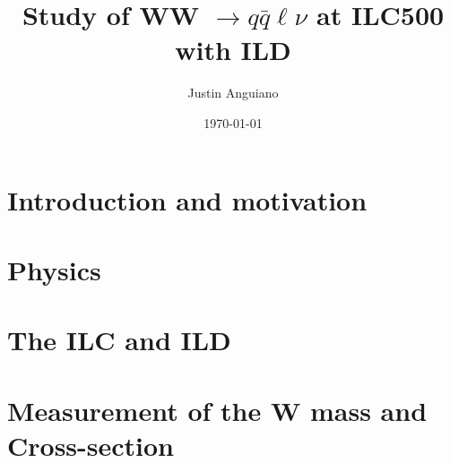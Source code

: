 \documentclass[%
 amsmath,amssymb,
 aps,
 prc
]{revtex4-1}
\begin{document}
\title{Study of WW $\rightarrow q\bar{q}\ell\nu$ at ILC500 with ILD }
\author{Justin Anguiano}
\date{\today}



\begin{abstract}

\end{abstract}


\maketitle
\clearpage\mbox{}\clearpage

\section{Introduction and motivation}
\label{sec:Introduction}


\section{Physics}
\label{sec:physics}





\section{The ILC and ILD}
\label{sec:ILC_detector}



\section{Measurement of the W mass and Cross-section}
\label{Current_Work} 

\end{document}
